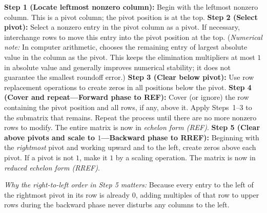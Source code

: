 \documentclass[10pt]{scrartcl}
\begin{document}
\begin{steps}
  \ii \textbf{Step 1 (Locate leftmost nonzero column):} Begin with the leftmost nonzero column. This is a pivot column; the pivot position is at the top.
  \ii \textbf{Step 2 (Select pivot):} Select a nonzero entry in the pivot column as a pivot. If necessary, interchange rows to move this entry into the pivot position at the top. (\emph{Numerical note:} In computer arithmetic,  chooses the remaining entry of largest absolute value in the column as the pivot. This keeps the elimination multipliers at most $1$ in absolute value and generally improves numerical stability; it does not guarantee the smallest roundoff error.)
  \ii \textbf{Step 3 (Clear below pivot):} Use row replacement operations to create zeros in all positions below the pivot.
  \ii \textbf{Step 4 (Cover and repeat---Forward phase to REF):} Cover (or ignore) the row containing the pivot position and all rows, if any, above it. Apply Steps~1--3 to the submatrix that remains. Repeat the process until there are no more nonzero rows to modify. The entire matrix is now in \emph{echelon form (REF)}.
  \ii \textbf{Step 5 (Clear above pivots and scale to $1$---Backward phase to RREF):} Beginning with the \emph{rightmost} pivot and working upward and to the left, create zeros above each pivot. If a pivot is not $1$, make it $1$ by a scaling operation. The matrix is now in \emph{reduced echelon form (RREF)}.
\end{steps}
\emph{Why the right-to-left order in Step 5 matters:} Because every entry to the left of the rightmost pivot in its row is already $0$, adding multiples of that row to upper rows during the backward phase never disturbs any columns to the left.
\end{document}
